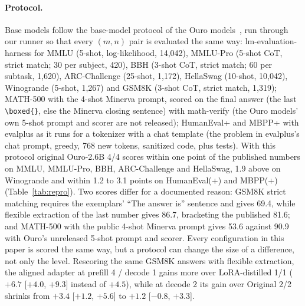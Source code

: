 \documentclass[11pt]{article}
\begin{document}
\paragraph{Protocol.} Base models follow the base-model protocol of the Ouro models~\citep[Appendix~C.1]{ouro}, run through
our runner so that every $(m,n)$ pair is evaluated the same way: lm-evaluation-harness for MMLU (5-shot, log-likelihood,
14,042), MMLU-Pro (5-shot CoT, strict match; 30 per subject, 420), BBH (3-shot CoT, strict match; 60 per subtask, 1,620),
ARC-Challenge (25-shot, 1,172), HellaSwag (10-shot, 10,042), Winogrande (5-shot, 1,267) and GSM8K (3-shot CoT, strict
match, 1,319); MATH-500 with the 4-shot Minerva prompt, scored on the final answer (the last \verb|\boxed{}|, else the Minerva
closing sentence) with math-verify (the Ouro models' own 5-shot prompt and scorer are not released); HumanEval+ and MBPP+ with evalplus as it runs for a tokenizer with a chat template (the problem
in evalplus's chat prompt, greedy, 768 new tokens, sanitized code, plus tests). With this protocol original Ouro-2.6B 4/4
scores within one point of the published numbers on MMLU, MMLU-Pro, BBH, ARC-Challenge and HellaSwag, 1.9 above on Winogrande and within 1.2 to 3.1 points on
HumanEval(+) and MBPP(+) (Table~\ref{tab:repro}). Two scores differ for a documented reason: GSM8K strict matching
requires the exemplars' ``The answer is'' sentence and gives 69.4, while flexible extraction of the last number gives
86.7, bracketing the published 81.6; and MATH-500 with the public 4-shot Minerva prompt gives 53.6 against 90.9 with
Ouro's unreleased 5-shot prompt and scorer. Every configuration in this paper is scored the same way, but a protocol
can change the size of a difference, not only the level. Rescoring the same GSM8K answers with flexible extraction,
the aligned adapter at prefill 4 / decode 1 gains more over LoRA-distilled 1/1 ($+6.7$ [$+4.0$, $+9.3$] instead of
$+4.5$), while at decode 2 its gain over Original 2/2 shrinks from $+3.4$ [$+1.2$, $+5.6$] to $+1.2$ [$-0.8$, $+3.3$].
\end{document}

